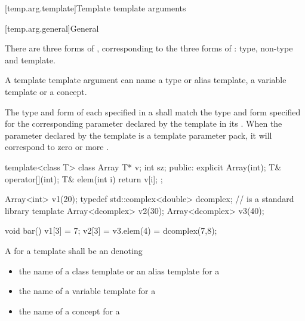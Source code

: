\documentclass{wg21}
\begin{document}
[temp.arg.template]{Template template arguments}

[temp.arg.general]{General}

\pnum
{}%
There are three forms of
,
corresponding to the three forms of
:
type, non-type and template.
\begin{addedblock}
A template template argument can name a type or alias template, a variable template or a concept.
\end{addedblock}

The type and form of each
specified in a
shall match the type and form specified for the corresponding
parameter declared by the template in its
.
When the parameter declared by the template is a template
parameter pack, it will correspond to zero or more
.
\begin{example}
\begin{codeblock}
    template<class T> class Array {
        T* v;
        int sz;
        public:
        explicit Array(int);
        T& operator[](int);
        T& elem(int i) { return v[i]; }
    };

    Array<int> v1(20);
    typedef std::complex<double> dcomplex;  //  is a standard library template
    Array<dcomplex> v2(30);
    Array<dcomplex> v3(40);

    void bar() {
        v1[3] = 7;
        v2[3] = v3.elem(4) = dcomplex(7,8);
    }
\end{codeblock}
\end{example}

\pnum
{}

\begin{addedblock}
A  for a template  shall be an  denoting
\begin{itemize}
\item the name of a class template or an alias template for a 
\item the name of a variable template for a 
\item the name of a concept for a 
\end{itemize}
\end{addedblock}
\end{document}
